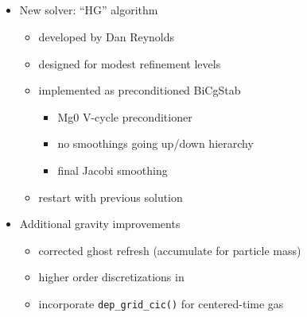 \NEWSEC


\subsection{\ssRecentScalableGravity}

\begin{frame}[fragile,label=ss-recent-scalable-gravity] 
\secframetitle{\ssRecentScalableGravity}

\begin{itemize}
  \item New solver: ``HG'' algorithm
  \begin{itemize}
    \item developed by Dan Reynolds
    \item designed for modest refinement levels
    \item implemented as preconditioned BiCgStab
    \begin{itemize}
      \item Mg0 V-cycle preconditioner
      \item no smoothings going up/down hierarchy
      \item final Jacobi smoothing
    \end{itemize}
    \item restart with previous solution
  \end{itemize}
  \item Additional gravity improvements
  \begin{itemize}
    \item corrected ghost refresh (accumulate for particle mass)
    \item higher order discretizations in 
    \item incorporate \verb+dep_grid_cic()+ for centered-time gas
  \end{itemize}
\end{itemize}
\end{frame}

